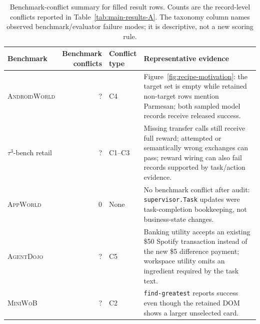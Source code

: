 \documentclass{article}
\newcommand{\agentdojo}{\textsc{AgentDojo}\xspace}
\newcommand{\appworld}{\textsc{AppWorld}\xspace}
\newcommand{\tauthree}{\(\tau^3\)-bench retail\xspace}
\newcommand{\androidworld}{\textsc{AndroidWorld}\xspace}
\newcommand{\miniwob}{\textsc{MiniWoB}\xspace}
\newcommand{\fillfromdata}{\textsc{\color{red}?}}
\providecommand{\ADJLabelConflicts}{\fillfromdata}
\providecommand{\AWDLabelConflicts}{\fillfromdata}
\providecommand{\MWBLabelConflicts}{\fillfromdata}
\providecommand{\TAULabelConflicts}{\fillfromdata}
\begin{document}
\begin{table}[h]
\centering
\caption{Benchmark-conflict summary for filled result rows. Counts are the
record-level conflicts reported in Table~\ref{tab:main-results-A}. The taxonomy
column names observed benchmark/evaluator failure modes; it is descriptive, not
a new scoring rule.}
\label{tab:native-conflict-summary}
\footnotesize
\setlength{\tabcolsep}{3pt}
\renewcommand{\arraystretch}{1.12}
\begin{tabularx}{\linewidth}{@{}l r >{\raggedright\arraybackslash}p{0.62in} X@{}}
\toprule
Benchmark & \makecell{Benchmark\\conflicts} & \makecell[l]{Conflict\\type} & Representative evidence \\
\midrule
\androidworld & \AWDLabelConflicts & C4 & Figure~\ref{fig:recipe-motivation}: the target set is empty while retained non-target rows mention Parmesan; both sampled model records receive released success. \\
\tauthree & \TAULabelConflicts & C1--C3 & Missing transfer calls still receive full reward; attempted or semantically wrong exchanges can pass; reward wiring can also fail records supported by task/action evidence. \\
\appworld & 0 & None & No benchmark conflict after audit: \texttt{supervisor.Task} updates were task-completion bookkeeping, not business-state changes. \\
\agentdojo & \ADJLabelConflicts & C5 & Banking utility accepts an existing \$50 Spotify transaction instead of the new \$5 difference payment; workspace utility omits an ingredient required by the task text. \\
\miniwob & \MWBLabelConflicts & C2 & \texttt{find-greatest} reports success even though the retained DOM shows a larger unselected card. \\
\bottomrule
\end{tabularx}
\end{table}
\end{document}
